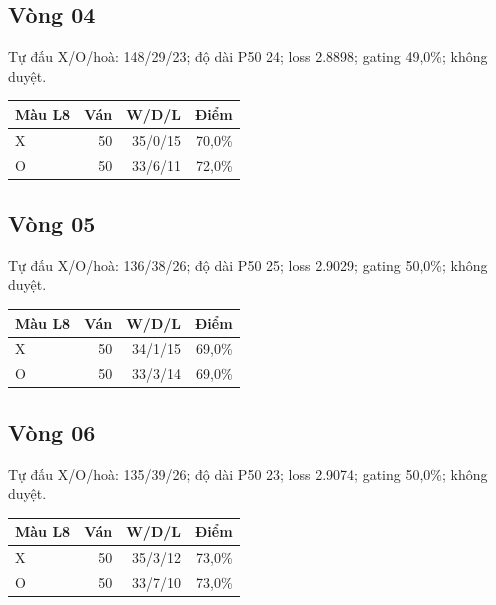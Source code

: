 \subsection*{Vòng 04}

Tự đấu X/O/hoà: 148/29/23; độ dài P50 24; loss 2.8898; gating 49,0\%; không duyệt.

\begin{center}\scriptsize\begin{tabular}{@{}lrrr@{}}\toprule

Màu L8 & Ván & W/D/L & Điểm \\

\midrule

X & 50 & 35/0/15 & 70,0\% \\

O & 50 & 33/6/11 & 72,0\% \\

\bottomrule\end{tabular}\end{center}

\subsection*{Vòng 05}

Tự đấu X/O/hoà: 136/38/26; độ dài P50 25; loss 2.9029; gating 50,0\%; không duyệt.

\begin{center}\scriptsize\begin{tabular}{@{}lrrr@{}}\toprule

Màu L8 & Ván & W/D/L & Điểm \\

\midrule

X & 50 & 34/1/15 & 69,0\% \\

O & 50 & 33/3/14 & 69,0\% \\

\bottomrule\end{tabular}\end{center}

\subsection*{Vòng 06}

Tự đấu X/O/hoà: 135/39/26; độ dài P50 23; loss 2.9074; gating 50,0\%; không duyệt.

\begin{center}\scriptsize\begin{tabular}{@{}lrrr@{}}\toprule

Màu L8 & Ván & W/D/L & Điểm \\

\midrule

X & 50 & 35/3/12 & 73,0\% \\

O & 50 & 33/7/10 & 73,0\% \\

\bottomrule\end{tabular}\end{center}

